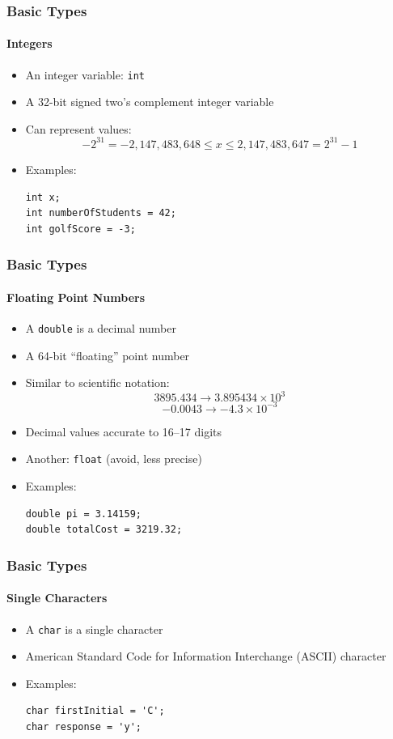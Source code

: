 \documentclass[]{beamer}
\begin{document}
\begin{frame}[fragile]
    \frametitle{Basic Types}
    \framesubtitle{Integers}

\begin{itemize}[<+->]
  \item An integer variable: \texttt{int}
  \item A 32-bit signed two's complement integer variable
  \item Can represent values:
    $$-2^{31} = -2,147,483,648 \leq x \leq 2,147,483,647 = 2^{31} - 1$$
  \item Examples:
\begin{verbatim}
int x;
int numberOfStudents = 42;
int golfScore = -3;
\end{verbatim}
\end{itemize}

\end{frame}

\begin{frame}[fragile]
    \frametitle{Basic Types}
    \framesubtitle{Floating Point Numbers}

\begin{itemize}[<+->]
  \item A \texttt{double} is a decimal number
  \item A 64-bit ``floating'' point number
  \item Similar to scientific notation:
  $$3895.434 \rightarrow 3.895434 \times 10^{3}$$
  $$-0.0043 \rightarrow -4.3 \times 10^{-3}$$
  \item Decimal values accurate to 16--17 digits %
  \item Another: \texttt{float} (avoid, less precise)
  \item Examples:
\begin{verbatim}
double pi = 3.14159;
double totalCost = 3219.32;
\end{verbatim}
\end{itemize}

\end{frame}

\begin{frame}[fragile]
    \frametitle{Basic Types}
    \framesubtitle{Single Characters}

\begin{itemize}[<+->]
  \item A \texttt{char} is a single character
  \item American Standard Code for Information Interchange (ASCII) character %
  \item Examples:
\begin{verbatim}
char firstInitial = 'C';
char response = 'y';
\end{verbatim}
\end{itemize}

\end{frame}
\end{document}

